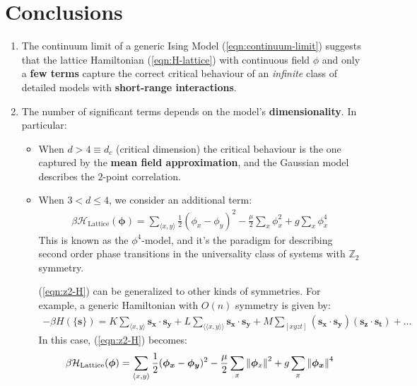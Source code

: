\documentclass[../../main.tex]{subfiles}
\begin{document}
\section{Conclusions}
\begin{enumerate}
    \item The continuum limit of a generic Ising Model (\ref{eqn:continuum-limit}) suggests that the lattice Hamiltonian (\ref{eqn:H-lattice}) with continuous field $\phi$ and only a \textbf{few terms} capture the correct critical behaviour of an \textit{infinite} class of detailed models with \textbf{short-range interactions}.
    \item The number of significant terms depends on the model's \textbf{dimensionality}. In particular:
    \begin{itemize}
        \item When $d > 4 \equiv d_c$ (critical dimension) the critical behaviour is the one captured by the \textbf{mean field approximation}, and the Gaussian model describes the $2$-point correlation.
        \item When $3 < d \leq 4$, we consider an additional term:
        \begin{align} \label{eqn:z2-H}
            \beta \mathcal{H}_{\mathrm{Lattice}}(\bm{\phi}) = \sum_{\langle x,y \rangle} \frac{1}{2} (\phi_x - \phi_y)^2 -\frac{\mu}{2}\sum_x \phi_x^2 + g \sum_x \phi_x^4 
        \end{align}
        This is known as the $\phi^4$-model, and it's the paradigm for describing second order phase transitions in the universality class of systems with $\mathbb{Z}_2$ symmetry.

        \medskip

        (\ref{eqn:z2-H}) can be generalized to other kinds of symmetries. For example, a generic Hamiltonian with $O(n)$ symmetry is given by:
        \begin{align*}
            - \beta H(\{\bm{s}\}) = K \sum_{\langle x,y \rangle} \bm{s_x} \cdot \bm{s_y} + L \sum_{\langle \langle x,y \rangle \rangle} \bm{s_x} \cdot \bm{s_y} + M \sum_{[xyzt]} (\bm{s_x} \cdot \bm{s_y}) (\bm{s_z} \cdot \bm{s_t}) + \dots
        \end{align*}
        In this case, (\ref{eqn:z2-H}) becomes:
        \begin{align*}
            \beta \mathcal{H}_{\mathrm{Lattice}}(\bm{\phi}) = \sum_{\langle x,y \rangle} \frac{1}{2} (\bm{\phi_x} - \bm{\phi_y})^2 - \frac{\mu}{2} \sum_x \norm{\bm{\phi}_x}^2  + g\sum_x \norm{\bm{\phi_x}}^4 
        \end{align*}
    \end{itemize}
\end{enumerate}
\end{document}
